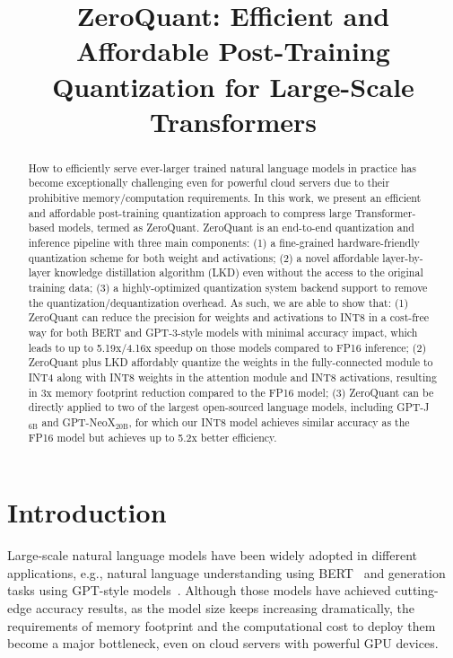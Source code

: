 \title{ZeroQuant: Efficient and Affordable Post-Training Quantization for Large-Scale Transformers}

\begin{abstract}
How to efficiently serve ever-larger trained natural language models in practice has become exceptionally challenging even for powerful cloud servers due to their prohibitive memory/computation requirements. In this work, we present an efficient and affordable post-training quantization approach to compress large Transformer-based models, termed as ZeroQuant. ZeroQuant is an end-to-end quantization and inference pipeline with three main components: (1) a fine-grained hardware-friendly quantization scheme for both weight and activations; (2) a novel affordable layer-by-layer knowledge distillation algorithm (LKD) even without the access to the original training data; (3) a highly-optimized quantization system backend support to remove the quantization/dequantization overhead. As such, we are able to show that: (1) ZeroQuant can reduce the precision for weights and activations to INT8 in a cost-free way for both BERT and GPT-3-style models with minimal accuracy impact, which leads to up to 5.19x/4.16x speedup on those models compared to FP16 inference; (2) ZeroQuant plus LKD affordably quantize the weights in the fully-connected module to INT4 along with INT8 weights in the attention module and INT8 activations, resulting in 3x memory footprint reduction compared to the FP16 model; (3) ZeroQuant can be directly applied to two of the largest open-sourced language models, including GPT-J$_{\text{6B}}$ and GPT-NeoX$_{\text{20B}}$, for which our INT8 model achieves similar accuracy as the FP16 model but achieves up to 5.2x better efficiency.
\end{abstract}

\section{Introduction}
\label{sec:intro}

Large-scale natural language models have been widely adopted in different applications, e.g., natural language understanding using BERT~\cite{tenney2019bert} and generation tasks using GPT-style models~\cite{radford2019gpt}. Although those models have achieved cutting-edge accuracy results, as the model size keeps increasing dramatically, the requirements of memory footprint and the computational cost to deploy them become a major bottleneck, even on cloud servers with powerful GPU devices. 

